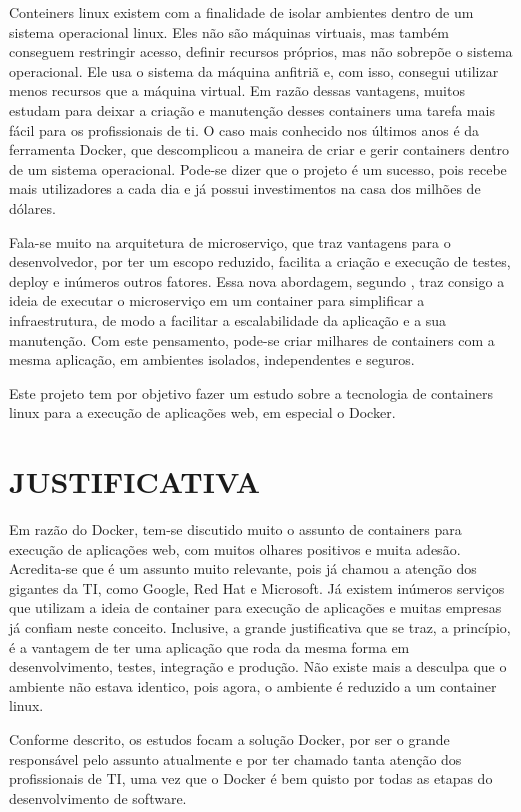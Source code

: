 \documentclass[
	12pt,				%
	openright,			%
	oneside,			%
	a4paper,			%
	chapter=TITLE,		%
	section=TITLE,		%
	english,			%
	french,				%
	spanish,			%
	brazil				%
	]{abntex2}
\begin{document}
Conteiners linux existem com a finalidade de isolar ambientes dentro de um sistema operacional linux. Eles não são máquinas virtuais, mas também conseguem restringir acesso, definir recursos próprios, mas não sobrepõe o sistema operacional. Ele usa o sistema da máquina anfitriã e, com isso, consegui utilizar menos recursos que a máquina virtual. Em razão dessas vantagens, muitos estudam para deixar a criação e manutenção desses containers uma tarefa mais fácil para os profissionais de ti. O caso mais conhecido nos últimos anos é da ferramenta Docker, que descomplicou a maneira de criar e gerir containers dentro de um sistema operacional. Pode-se dizer que o projeto é um sucesso, pois recebe mais utilizadores a cada dia e já possui investimentos na casa dos milhões de dólares.

Fala-se muito na arquitetura de microserviço, que traz vantagens para o desenvolvedor, por ter um escopo reduzido, facilita a criação e execução de testes, deploy e inúmeros outros fatores. Essa nova abordagem, segundo , traz consigo a ideia de executar o microserviço em um container para simplificar a infraestrutura, de modo a facilitar a escalabilidade da aplicação e a sua manutenção. Com este pensamento, pode-se criar milhares de containers com a mesma aplicação, em ambientes isolados, independentes e seguros.

Este projeto tem por objetivo fazer um estudo sobre a tecnologia de containers linux para a execução de aplicações web, em especial o Docker.


\section{JUSTIFICATIVA}

Em razão do Docker, tem-se discutido muito o assunto de containers para execução de aplicações web, com muitos olhares positivos e muita adesão. Acredita-se que é um assunto muito relevante, pois já chamou a atenção dos gigantes da TI, como Google, Red Hat e Microsoft. Já existem inúmeros serviços que utilizam a ideia de container para execução de aplicações e muitas empresas já confiam neste conceito. Inclusive, a grande justificativa que se traz, a princípio, é a vantagem de ter uma aplicação que roda da mesma forma em desenvolvimento, testes, integração e produção. Não existe mais a desculpa que o ambiente não estava identico, pois agora, o ambiente é reduzido a um container linux.

Conforme descrito, os estudos focam a solução Docker, por ser o grande responsável pelo assunto atualmente e por ter chamado tanta atenção dos profissionais de TI, uma vez que o Docker é bem quisto por todas as etapas do desenvolvimento de software.
\end{document}
